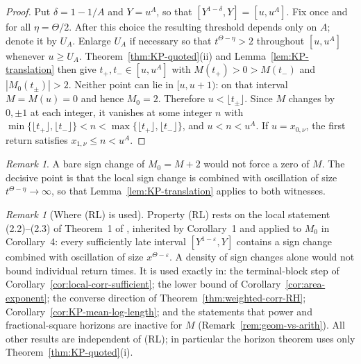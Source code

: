 \documentclass[11pt]{amsart}
\numberwithin{equation}{section}
\theoremstyle{plain}
\theoremstyle{definition}
\theoremstyle{remark}
\newtheorem{remark}[theorem]{Remark}
\begin{document}
\begin{proof}
Put $\delta=1-1/A$ and $Y=u^A$, so that
$[Y^{1-\delta},Y]=[u,u^A]$.  Fix once and for all
$\eta=\Theta/2$.  After this choice the resulting threshold depends only
on $A$; denote it by $U_A$.  Enlarge $U_A$ if necessary so that
$t^{\Theta-\eta}>2$ throughout $[u,u^A]$ whenever $u\ge U_A$.
Theorem~\ref{thm:KP-quoted}(ii) and Lemma~\ref{lem:KP-translation} then give
$t_+,t_-\in[u,u^A]$ with $M(t_+)>0>M(t_-)$ and
$|M_0(t_\pm)|>2$.  Neither point can lie in $[u,u+1)$: on that interval
$M=M(u)=0$ and hence $M_0=2$.  Therefore $u<\lfloor t_\pm\rfloor$. Since $M$ changes by
$0,\pm1$ at each integer, it vanishes at some integer $n$ with
$\min\{\lfloor t_+\rfloor,\lfloor t_-\rfloor\}<n<\max\{\lfloor t_+\rfloor,\lfloor t_-\rfloor\}$, and $u<n<u^A$. If
$u=x_{0,\nu}$, the first return satisfies $x_{1,\nu}\le n<u^A$.
\end{proof}

\begin{remark}
A bare sign change of $M_0=M+2$ would not force a zero of $M$. The
decisive point is that the local sign change is combined with oscillation of
size $t^{\Theta-\eta}\to\infty$, so that Lemma~\ref{lem:KP-translation}
applies to both witnesses.
\end{remark}

\begin{remark}[Where (RL) is used]
\label{rem:RL-dependence}
Property (RL) rests on the local statement (2.2)--(2.3) of
Theorem~1 of \cite{KP86}, inherited by Corollary~1 and applied to $M_0$ in
Corollary~4: every sufficiently late interval $[Y^{1-\varepsilon},Y]$
contains a sign change combined with oscillation of size
$x^{\Theta-\varepsilon}$.  A density of sign changes alone would not bound
individual return times. It is used exactly in:
the terminal-block step of Corollary~\ref{cor:local-corr-sufficient}; the
lower bound of Corollary~\ref{cor:area-exponent}; the converse direction of
Theorem~\ref{thm:weighted-corr-RH}; Corollary~\ref{cor:KP-mean-log-length};
and the statements that power and fractional-square horizons are inactive
for $M$ (Remark~\ref{rem:geom-vs-arith}). All other results are independent
of (RL); in particular the horizon theorem uses only
Theorem~\ref{thm:KP-quoted}(i).
\end{remark}
\end{document}
